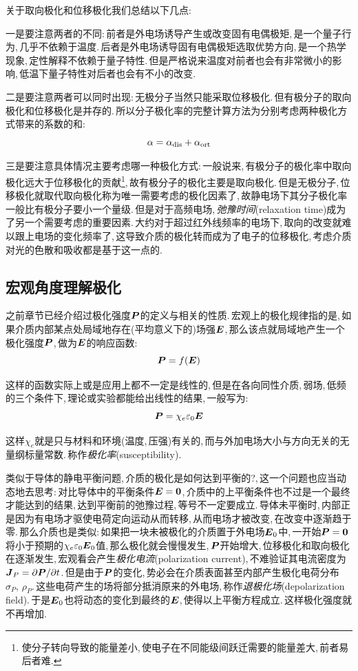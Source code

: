 关于取向极化和位移极化我们总结以下几点:

一是要注意两者的不同:\,前者是外电场诱导产生或改变固有电偶极矩,\,是一个量子行为,\,几乎不依赖于温度.\,后者是外电场诱导固有电偶极矩选取优势方向,\,是一个热学现象,\,定性解释不依赖于量子特性.\,但是严格说来温度对前者也会有非常微小的影响,\,低温下量子特性对后者也会有不小的改变.

二是要注意两者可以同时出现:\,无极分子当然只能采取位移极化.\,但有极分子的取向极化和位移极化是并存的.\,所以分子极化率的完整计算方法为分别考虑两种极化方式带来的系数的和:
\[\alpha=\alpha_{\rm dis}+\alpha_{\rm ort}\]

三是要注意具体情况主要考虑哪一种极化方式:\,一般说来,\,有极分子的极化率中取向极化远大于位移极化的贡献\footnote{使分子转向导致的能量差小,\,使电子在不同能级间跃迁需要的能量差大,\,前者易后者难.},\,故有极分子的极化主要是取向极化.\,但是无极分子,\,位移极化就取代取向极化称为唯一需要考虑的极化因素了,\,故静电场下其分子极化率一般比有极分子要小一个量级.\,但是对于高频电场,\,\emph{弛豫时间}(relaxation time)成为了另一个需要考虑的重要因素.\,大约对于超过红外线频率的电场下,\,取向的改变就难以跟上电场的变化频率了,\,这导致介质的极化转而成为了电子的位移极化,\,考虑介质对光的色散和吸收都是基于这一点的.

\subsection{宏观角度理解极化}

之前章节已经介绍过极化强度$\boldsymbol{P}$的定义与相关的性质.\,宏观上的极化规律指的是,\,如果介质内部某点处局域地存在(平均意义下的)场强$\boldsymbol{E}$,\,那么该点就局域地产生一个极化强度$\boldsymbol{P}$,\,做为$\boldsymbol{E}$的响应函数:
\[\boldsymbol{P}=f(\boldsymbol{E})\]

这样的函数实际上或是应用上都不一定是线性的,\,但是在各向同性介质,\,弱场,\,低频的三个条件下,\,理论或实验都能给出线性的结果,\,一般写为:
\[\boldsymbol{P}=\chi_e \varepsilon_0 \boldsymbol{E}\]

这样$\chi_e$就是只与材料和环境(温度,\,压强)有关的,\,而与外加电场大小与方向无关的无量纲标量常数.\,称作\emph{极化率}(susceptibility).

类似于导体的静电平衡问题,\,介质的极化是如何达到平衡的?,\,这一个问题也应当动态地去思考:\,对比导体中的平衡条件$\boldsymbol{E}=\boldsymbol{0}$,\,介质中的上平衡条件也不过是一个最终才能达到的结果,\,达到平衡前的弛豫过程,\,等号不一定要成立.\,导体未平衡时,\,内部正是因为有电场才驱使电荷定向运动从而转移,\,从而电场才被改变,\,在改变中逐渐趋于零.\,那么介质也是类似:\,如果把一块未被极化的介质置于外电场$\boldsymbol{E}_0$中,\,一开始$\boldsymbol{P}=\boldsymbol{0}$将小于预期的$\chi_e \varepsilon_0 \boldsymbol{E}_0$值,\,那么极化就会慢慢发生,\,$\boldsymbol{P}$开始增大,\,位移极化和取向极化在逐渐发生,\,宏观看会产生\emph{极化电流}(polarization current),\,不难验证其电流密度为$\boldsymbol{J}_P=\partial \boldsymbol{P}/\partial t$.\,但是由于$\boldsymbol{P}$的变化,\,势必会在介质表面甚至内部产生极化电荷分布$\sigma_P,\,\rho_P$.\,这些电荷产生的场将部分抵消原来的外电场,\,称作\emph{退极化场}(depolarization field).\,于是$\boldsymbol{E}_0$也将动态的变化到最终的$\boldsymbol{E}$,\,使得以上平衡方程成立.\,这样极化强度就不再增加.

